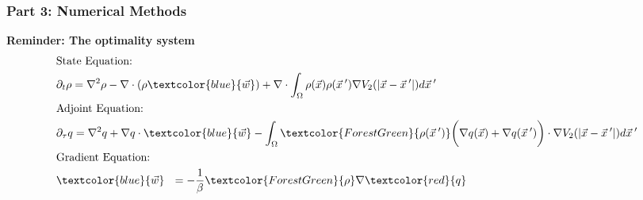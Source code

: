 \documentclass[aspectratio=169,xcolor=dvipsnames]{beamer}
\begin{document}
\begin{frame}
	\frametitle{Part 3: Numerical Methods}
	\textbf{Reminder: The optimality system}
	 \begin{align*}
	 &\text{State Equation:}\\
	 &\partial_t \rho  = \nabla^2 \rho  - \nabla \cdot (\rho \textcolor{blue}{\vec{w}} )
	 + \nabla \cdot \int_\Omega \rho(\vec{x}) \rho(\vec{x}\hspace{0.2em}') \nabla V_2(|\vec{x}-\vec{x}\hspace{0.2em}'|)d\vec{x}\hspace{0.2em}'  \\
	 &\text{Adjoint Equation:}\\
	 &\partial_{{\tau}} q  = \nabla^2 q  + \nabla q  \cdot \textcolor{blue}{\vec{w}}  
	 - \int_\Omega \textcolor{ForestGreen}{\rho( \vec{x}\hspace{0.2em}')} \bigg(\nabla q(\vec{x}) + \nabla q(\vec{x}\hspace{0.2em}')\bigg) \cdot \nabla V_2(|\vec{x}-\vec{x}\hspace{0.2em}'|)d\vec{x}\hspace{0.2em}' \\
	 &\text{Gradient Equation:}\\
	 &\textcolor{blue}{\vec{w}} \ \ = - \frac{1}{\beta}\textcolor{ForestGreen}{\rho} \nabla \textcolor{red}{q} \\
	 \end{align*}
\end{frame}
\end{document}
